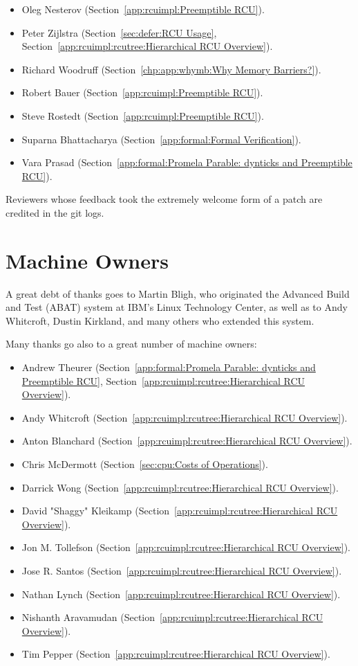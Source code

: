 \begin{itemize}
\item	Oleg Nesterov (Section~\ref{app:rcuimpl:Preemptible RCU}).
\item	Peter Zijlstra
	(Section~\ref{sec:defer:RCU Usage}, %
	Section~\ref{app:rcuimpl:rcutree:Hierarchical RCU Overview}).
\item	Richard Woodruff (Section~\ref{chp:app:whymb:Why Memory Barriers?}).
\item	Robert Bauer (Section~\ref{app:rcuimpl:Preemptible RCU}).
\item	Steve Rostedt (Section~\ref{app:rcuimpl:Preemptible RCU}).
\item	Suparna Bhattacharya
	(Section~\ref{app:formal:Formal Verification}).
\item	Vara Prasad
	(Section~\ref{app:formal:Promela Parable: dynticks and Preemptible RCU}).
\end{itemize}

Reviewers whose feedback took the extremely welcome form of a patch
are credited in the git logs.

\section{Machine Owners}

A great debt of thanks goes to Martin Bligh, who originated the
Advanced Build and Test (ABAT) system at IBM's Linux Technology
Center, as well as to Andy Whitcroft, Dustin Kirkland, and many
others who extended this system.

Many thanks go also to a great number of machine owners:

\begin{itemize}
\item	Andrew Theurer
	(Section~\ref{app:formal:Promela Parable: dynticks and Preemptible RCU},
	Section~\ref{app:rcuimpl:rcutree:Hierarchical RCU Overview}).
\item	Andy Whitcroft (Section~\ref{app:rcuimpl:rcutree:Hierarchical RCU Overview}).
\item	Anton Blanchard (Section~\ref{app:rcuimpl:rcutree:Hierarchical RCU Overview}).
\item	Chris McDermott (Section~\ref{sec:cpu:Costs of Operations}).
\item	Darrick Wong (Section~\ref{app:rcuimpl:rcutree:Hierarchical RCU Overview}).
\item	David "Shaggy" Kleikamp (Section~\ref{app:rcuimpl:rcutree:Hierarchical RCU Overview}).
\item	Jon M. Tollefson (Section~\ref{app:rcuimpl:rcutree:Hierarchical RCU Overview}).
\item	Jose R. Santos (Section~\ref{app:rcuimpl:rcutree:Hierarchical RCU Overview}).
\item	Nathan Lynch (Section~\ref{app:rcuimpl:rcutree:Hierarchical RCU Overview}).
\item	Nishanth Aravamudan (Section~\ref{app:rcuimpl:rcutree:Hierarchical RCU Overview}).
\item	Tim Pepper (Section~\ref{app:rcuimpl:rcutree:Hierarchical RCU Overview}).
\end{itemize}

